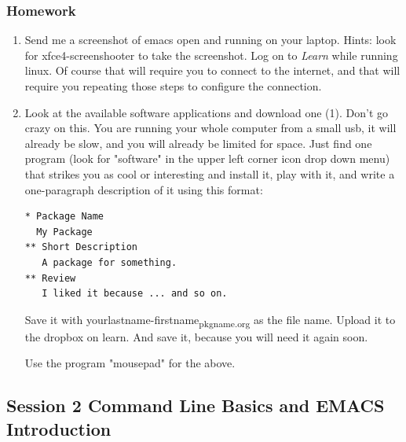 \documentclass{article}
\begin{document}
\subsubsection{Homework}
\label{sec:orged51166}
\begin{enumerate}
\item Send me a screenshot of emacs open and running on your laptop.
Hints: look for xfce4-screenshooter to take the screenshot. Log on to \emph{Learn} while running linux. Of course that will require you to connect to the internet, and that will require you repeating those steps to configure the connection.
\item Look at the available software applications and download one (1). Don't go crazy on this. You are running your whole computer from a small usb, it will already be slow, and you will already be limited for space. Just find one program (look for "software" in the upper left corner icon drop down menu) that strikes you as cool or interesting and install it, play with it, and write a one-paragraph description of it using this format:

\begin{verbatim}
* Package Name
  My Package
** Short Description
   A package for something.
** Review
   I liked it because ... and so on.
\end{verbatim}

Save it with yourlastname-firstname\textsubscript{pkgname.org} as the file name. Upload it to the dropbox on learn. And save it, because you will need it again soon. 

Use the program "mousepad" for the above.
\end{enumerate}
\subsection{Session 2 Command Line Basics and EMACS Introduction}
\label{sec:org393a4fa}
\end{document}
